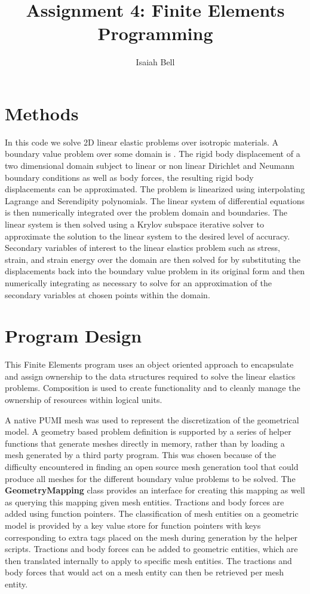 \documentclass{article}
\begin{document}
\title{Assignment 4: Finite Elements Programming}
\author{Isaiah Bell} 
\maketitle

\section{Methods}

In this code we solve 2D linear elastic problems over isotropic materials. A boundary value problem over some domain is . The rigid body displacement of a two dimensional domain subject to linear or non linear Dirichlet and Neumann boundary conditions as well as body forces, the resulting rigid body displacements can be approximated. The problem is linearized using interpolating Lagrange and Serendipity polynomials. The linear system of differential equations is then numerically integrated over the problem domain and boundaries. The linear system is then solved using a Krylov subspace iterative solver to approximate the solution to the linear system to the desired level of accuracy. Secondary variables of interest to the linear elastics problem such as stress, strain, and strain energy over the domain are then solved for by substituting the displacements back into the boundary value problem in its original form and then numerically integrating as necessary to solve for an approximation of the secondary variables at chosen points within the domain.


\section{Program Design}
This Finite Elements program uses an object oriented approach to encapsulate and assign ownership to the data structures required to solve the linear elastics problems. Composition is used to create functionality and to cleanly manage the ownership of resources within logical units.

A native PUMI mesh was used to represent the discretization of the geometrical model. A geometry based problem definition is supported by a series of helper functions that generate meshes directly in memory, rather than by loading a mesh generated by a third party program. This was chosen because of the difficulty encountered in finding an open source mesh generation tool that could produce all meshes for the different boundary value problems to be solved. The \textbf{GeometryMapping} class provides an interface for creating this mapping as well as querying this mapping given mesh entities. Tractions and body forces are added using function pointers. The classification of mesh entities on a geometric model is provided by a key value store for function pointers with keys corresponding to extra tags placed on the mesh during generation by the helper scripts. Tractions and body forces can be added to geometric entities, which are then translated internally to apply to specific mesh entities. The tractions and body forces that would act on a mesh entity can then be retrieved per mesh entity.
\end{document}
